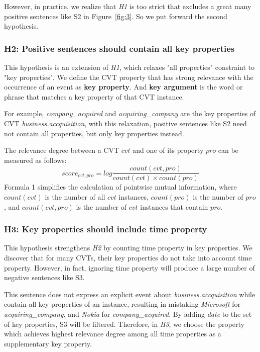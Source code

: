 \documentclass{article}
\begin{document}
However, in practice, we realize that \emph{H1} is too strict that excludes a great many positive sentences like S2 in Figure~\ref{fig:3}. So we put forward the second hypothesis.

\subsubsection{H2: Positive sentences should contain all key properties}
This hypothesis is an extension of \emph{H1}, which relaxes "all properties" constraint to "key properties". We define the CVT property that has strong relevance with the occurrence of an event as \textbf{key property}. And \textbf{key argument} is the word or phrase that matches a key property of that CVT instance. 

For example, \emph{company\_acquired} and \emph{acquiring\_company} are the key properties of CVT \emph{business.accquisition}, with this relaxation, positive sentences like S2 need not contain all properties, but only key properties instead.

The relevance degree between a CVT $cvt$ and one of its property $pro$ can be measured as follows:
\begin{equation}
	score_{cvt, pro} = log \frac{count(cvt, pro)}{count(cvt) \times count(pro)} 
\end{equation}
Formula 1 simplifies the calculation of pointwise mutual information, where $count(cvt)$ is the number of all $cvt$ instances, $count(pro)$ is the number of $pro$, and $count(cvt, pro)$ is the number of $cvt$ instances that contain $pro$.

\subsubsection{H3: Key properties should include time property}
This hypothesis strengthens \emph{H2} by counting time property in key properties. We discover that for many CVTs, their key properties do not take into account time property. However, in fact, ignoring time property will produce a large number of negative sentences like S3. 

This sentence does not express an explicit event about \emph{business.accquisition} while contain all key properties of an instance, resulting in mistaking \emph{Microsoft} for \emph{acquiring\_company}, and \emph{Nokia} for \emph{company\_acquired}. By adding \emph{date} to the set of key properties, S3 will be filtered. Therefore, in \emph{H3}, we choose the property which achieves highest relevance degree among all time properties as a supplementary key property. 
\end{document}
